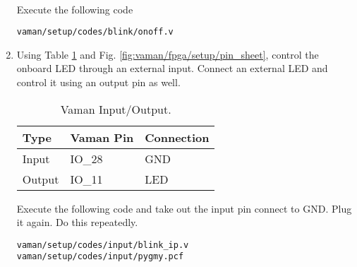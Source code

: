\begin{enumerate}[label=\arabic*.,ref=\theenumi]
	\\
\solution  Execute the following code
\begin{lstlisting}
vaman/setup/codes/blink/onoff.v
\end{lstlisting}
\item  Using Table \ref{tab:vaman/fpga/setup/input} and Fig.  \ref{fig:vaman/fpga/setup/pin_sheet}, control the onboard LED
through an external input. Connect an external LED and control it using an output pin as well.
%
\begin{table}[]
\centering
\begin{tabular}{|l|l|l|}
\hline
Type & Vaman Pin  &  Connection \\ \hline
Input &  IO\_28 &  GND\\ \hline
Output  & IO\_11  &  LED\\ \hline
\end{tabular}
\caption{Vaman Input/Output.}
\label{tab:vaman/fpga/setup/input}
\end{table}

\solution Execute the following code and take out the input pin connect to GND. Plug it again.
Do this repeatedly.

\begin{lstlisting}
vaman/setup/codes/input/blink_ip.v
vaman/setup/codes/input/pygmy.pcf
\end{lstlisting}


\end{enumerate}

